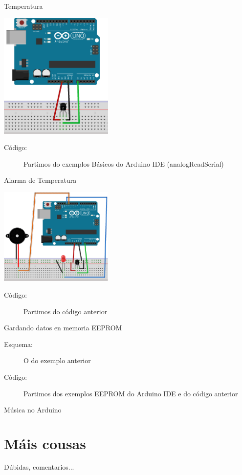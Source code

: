 \documentclass{beamer}
\begin{document}
\begin{frame}{Temperatura}
\begin{center}
\includegraphics[width=160pt]{./img/esquema_temperatura.png}
\end{center}

\begin{description}
\item[Código:] Partimos do exemplos Básicos do Arduino IDE (analogReadSerial)
\end{description}
\end{frame}

\begin{frame}{Alarma de Temperatura}
\begin{center}
\includegraphics[width=160pt]{./img/esquema_temperatura_alarma.png}
\end{center}

\begin{description}
\item[Código:] Partimos do código anterior
\end{description}
\end{frame}

\begin{frame}{Gardando datos en memoria EEPROM}
\begin{description}
\item[Esquema:] O do exemplo anterior
\item[Código:] Partimos dos exemplos EEPROM do Arduino IDE e do código anterior
\end{description}
\end{frame}

\begin{frame}{Música no Arduino}

\end{frame}





\section{Máis cousas}


\begin{frame}{Dúbidas, comentarios...}

\end{frame}
\end{document}
